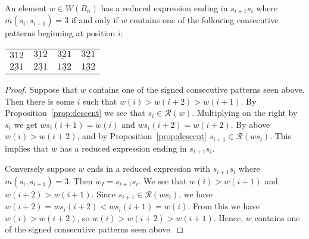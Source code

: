 \begin{proposition}\label{lem:st}
An element $w \in W(B_n)$ has a reduced expression ending in $s_{i+1}s_i$ where $m(s_i, s_{i+1})=3$ if and only if $w$ contains one of the following consecutive patterns beginning at position $i$:
%
\begin{center}
\begin{tabular}{llll}
$312$             & $3\underbar{1}2$ & $3 \underbar{2}1$ & $3\underbar{21}$  \\
$2\underbar{3}1$ & $2\underbar{31}$ & $1\underbar{32}$  & $\underbar{132}$ 

\end{tabular}	
\end{center}
%
\begin{proof}
	Suppose that $w$ contains one of the signed consecutive patterns seen above.  Then there is some $i$ such that $w(i)>w(i+2)>w(i+1)$. By Proposition~\ref{prop:descent} we see that $s_i \in \mathcal{R}(w)$. Multiplying on the right by $s_i$ we get $ws_i(i+1)=w(i)$ and $ws_i(i+2)=w(i+2)$. By above $w(i)>w(i+2)$, and by Proposition~\ref{prop:descent} $s_{i+1} \in \mathcal{R}(ws_i)$. This implies that $w$ has a reduced expression ending in $s_{i+1}s_i$. 
	
	Conversely suppose $w$ ends in a reduced expression with $s_{i+1}s_i$ where $m(s_i,s_{i+1})=3$. Then $w_I=s_{i+1}s_i$. We see that $w(i)>w(i+1)$ and $w(i+2)>w(i+1)$. Since $s_{i+1} \in \mathcal{R}(ws_i)$, we have $w(i+2)=ws_i(i+2)<ws_i(i+1)=w(i)$. From this we have $w(i)>w(i+2)$, so $w(i)>w(i+2)>w(i+1)$. Hence, $w$ contains one of the signed consecutive patterns seen above. 
\end{proof}
\end{proposition}

%
%

